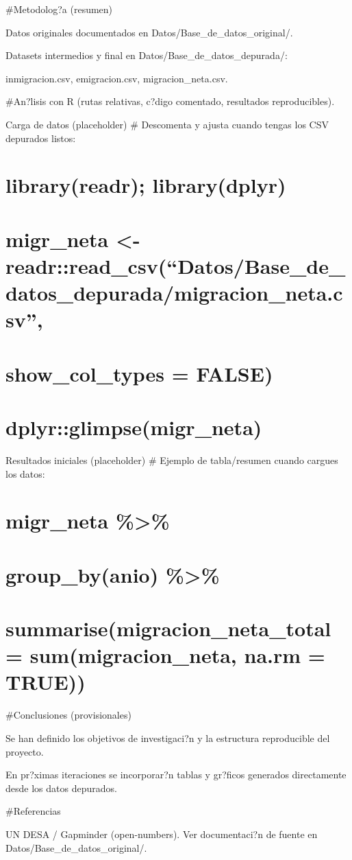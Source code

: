 \documentclass[
]{article}
\begin{document}
\#Metodolog?a (resumen)

Datos originales documentados en Datos/Base\_de\_datos\_original/.

Datasets intermedios y final en Datos/Base\_de\_datos\_depurada/:

inmigracion.csv, emigracion.csv, migracion\_neta.csv.

\#An?lisis con R (rutas relativas, c?digo comentado, resultados
reproducibles).

Carga de datos (placeholder) \# Descomenta y ajusta cuando tengas los
CSV depurados listos:

\section{library(readr);
library(dplyr)}\label{libraryreadr-librarydplyr}

\section{migr\_neta \textless-
readr::read\_csv(``Datos/Base\_de\_datos\_depurada/migracion\_neta.csv'',}\label{migr_neta---readrread_csvdatosbase_de_datos_depuradamigracion_neta.csv}

\section{show\_col\_types = FALSE)}\label{show_col_types-false}

\section{dplyr::glimpse(migr\_neta)}\label{dplyrglimpsemigr_neta}

Resultados iniciales (placeholder) \# Ejemplo de tabla/resumen cuando
cargues los datos:

\section{migr\_neta \%\textgreater\%}\label{migr_neta}

\section{group\_by(anio) \%\textgreater\%}\label{group_byanio}

\section{summarise(migracion\_neta\_total = sum(migracion\_neta, na.rm =
TRUE))}\label{summarisemigracion_neta_total-summigracion_neta-na.rm-true}

\#Conclusiones (provisionales)

Se han definido los objetivos de investigaci?n y la estructura
reproducible del proyecto.

En pr?ximas iteraciones se incorporar?n tablas y gr?ficos generados
directamente desde los datos depurados.

\#Referencias

UN DESA / Gapminder (open-numbers). Ver documentaci?n de fuente en
Datos/Base\_de\_datos\_original/.
\end{document}
